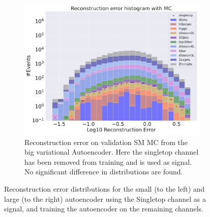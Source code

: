\begin{figure}[h!]
\begin{subfigure}{.45\textwidth}
        \includegraphics[width=\textwidth]{Figures/VAE_testing/big/b_data_recon_big_rm3_feats_sig_singletop.pdf}
        \caption{Reconstruction error on validation SM MC from the big variational Autoencoder. Here the singletop channel has been removed from training and 
        is used as signal. No significant difference in distributions are found. }
        \label{fig:vae_big_singletop}
    \end{subfigure}
    \hfill 
    \caption[VAE | Reconstruction error using Singletop channel as signal]{Reconstruction error distributions for the small (to the left) and large (to the right) autoencoder using the Singletop channel as a signal, and 
    training the autoencoder on the remaining channels. }
    \label{fig:vae_big_channel_2}
\end{figure}

